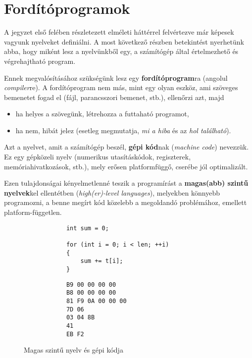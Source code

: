 \chapter{Fordítóprogramok}

A jegyzet első felében részletezett elméleti háttérrel felvértezve már képesek vagyunk nyelveket definiálni. A most következő részben betekintést nyerhetünk abba, hogy miként lesz a nyelvünkből egy, a számítógép által értelmezhető és végrehajtható program.

Ennek megvalósításához szükségünk lesz egy \textbf{fordítóprogram}ra (angolul \textit{compiler}re). A fordítóprogram nem más, mint egy olyan eszköz, ami szöveges bemenetet fogad el (fájl, parancsszori bemenet, stb.), ellenőrzi azt, majd

\begin{itemize}
	\item ha helyes a szövegünk, létrehozza a futtaható programot,
	\item ha nem, hibát jelez (esetleg megmutatja, \textit{mi a hiba} és az \textit{hol található}).
\end{itemize}

Azt a nyelvet, amit a számítógép beszél, \textbf{gépi kód}nak (\textit{machine code}) nevezzük. Ez egy gépközeli nyelv (numerikus utasításkódok, regiszterek, memóriahivatkozások, stb.), mely erősen platformfüggő, cserébe jól optimalizált.

Ezen tulajdonságai kényelmetlenné teszik a programírást a \textbf{magas(abb) szintű nyelvek}kel ellentétben (\textit{high(er)-level languages}), melyekben könnyebb programozni, a benne megírt kód közelebb a megoldandó problémához, emellett platform-független.

\begin{figure}[h!]
	\begin{minipage}{0.5\linewidth}
		\begin{verbatim}
			int sum = 0;
			
			for (int i = 0; i < len; ++i)
			{
			    sum += t[i];
			}
		\end{verbatim}
	\end{minipage}
	\begin{minipage}{0.5\linewidth}
		\begin{verbatim}
			B9 00 00 00 00
			B8 00 00 00 00
			81 F9 0A 00 00 00
			7D 06
			03 04 8B
			41
			EB F2
		\end{verbatim}
	\end{minipage}
	
	\caption{Magas szintű nyelv és gépi kódja}
\end{figure}

